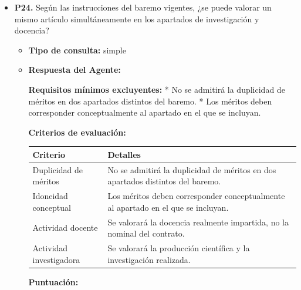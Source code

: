 \documentclass{article}
\begin{document}
\begin{itemize}
\begin{itemize}
\begin{scriptsize}
                  Revisión 3 (diciembre, 2024) 29
                \end{scriptsize}
        \end{itemize}


  \item \textbf{P24.} Según las instrucciones del baremo vigentes, ¿se puede valorar un mismo artículo simultáneamente en los apartados de investigación y docencia? \\
        \begin{itemize}
          \item \textbf{Tipo de consulta:} simple
          \item \textbf{Respuesta del Agente:}

                \textbf{Requisitos mínimos excluyentes:}
                * No se admitirá la duplicidad de méritos en dos apartados distintos del baremo.
                * Los méritos deben corresponder conceptualmente al apartado en el que se incluyan.

                \textbf{Criterios de evaluación:}

                \vspace{0.4cm}
                \begin{table}[h!]\centering\renewcommand{\arraystretch}{1.3}
                  \begin{tabular}{|p{}|p{}|}\hline
                    Criterio                & Detalles                                                                          \\\hline
                    Duplicidad de méritos   & No se admitirá la duplicidad de méritos en dos apartados distintos del baremo.    \\\hline
                    Idoneidad conceptual    & Los méritos deben corresponder conceptualmente al apartado en el que se incluyan. \\\hline
                    Actividad docente       & Se valorará la docencia realmente impartida, no la nominal del contrato.          \\\hline
                    Actividad investigadora & Se valorará la producción científica y la investigación realizada.                \\\hline
                  \end{tabular}\end{table}
                \vspace{0.4cm}

                \textbf{Puntuación:}


\end{itemize}
\end{itemize}
\end{document}
